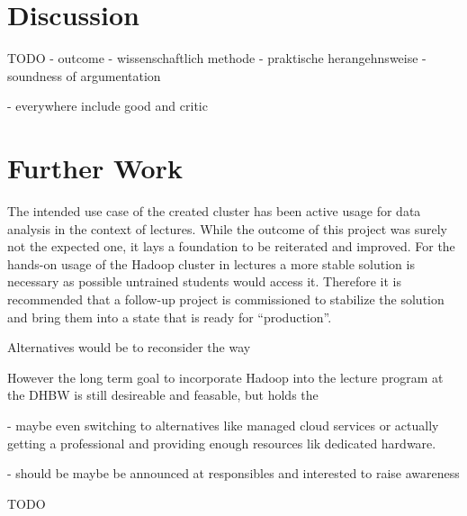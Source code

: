 \section{Discussion}


TODO
- outcome
- wissenschaftlich methode
- praktische herangehnsweise
- soundness of argumentation

- everywhere include good and critic


\section{Further Work}

The intended use case of the created cluster has been active usage for data analysis in the context of lectures.
While the outcome of this project was surely not the expected one, 
it lays a foundation to be reiterated and improved.
For the hands-on usage of the Hadoop cluster in lectures a more stable 
solution is necessary as possible untrained students would access it.
Therefore it is recommended that a follow-up project is commissioned to stabilize the solution and bring them into a state that is ready for \enquote{production}.

Alternatives would be to reconsider the way 

However the long term goal to incorporate Hadoop into the lecture program at the \ac{DHBW} is still desireable and feasable, but holds the 

- maybe even switching to alternatives like managed cloud services or actually getting a professional and providing enough resources lik dedicated hardware.

- should be maybe  be announced at responsibles and interested to raise awareness

TODO
